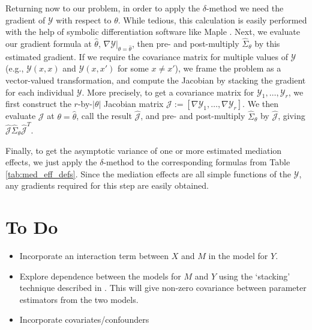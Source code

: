 \documentclass{article}
\newcommand{\sY}{\mathcal{Y}}
\begin{document}
Returning now to our problem, in order to apply the $\delta$-method we need the gradient of $\sY$ with respect to $\theta$. While tedious, this calculation is easily performed with the help of symbolic differentiation software like Maple \citep{Map20}. Next, we evaluate our gradient formula at $\hat{\theta}$, $\left. \nabla \sY \right|_{\theta = \hat{\theta}}$, then pre- and post-multiply $\hat{\Sigma}_\theta$ by this estimated gradient. If we require the covariance matrix for multiple values of $\sY$ (e.g., $\sY(x,x)$ and $\sY(x,x')$ for some $x \neq x'$), we frame the problem as a vector-valued transformation, and compute the Jacobian by stacking the gradient for each individual $\sY$. More precisely, to get a covariance matrix for $\sY_1, \ldots, \sY_r$, we first construct the $r$-by-$|\theta|$ Jacobian matrix $\mathcal{J} := [\nabla \sY_1, \ldots, \nabla \sY_r]$. We then evaluate $\mathcal{J}$ at $\theta = \hat{\theta}$, call the result $\hat{\mathcal{J}}$, and pre- and post-multiply $\hat{\Sigma}_\theta$ by $\hat{\mathcal{J}}$, giving $\hat{\mathcal{J}} \hat{\Sigma}_\theta \hat{\mathcal{J}}^T$.

Finally, to get the asymptotic variance of one or more estimated mediation effects, we just apply the $\delta$-method to the corresponding formulas from Table \ref{tab:med_eff_defs}. Since the mediation effects are all simple functions of the $\sY$, any gradients required for this step are easily obtained.


\section{To Do}
\begin{itemize}
    \item Incorporate an interaction term between $X$ and $M$ in the model for $Y$.
    \item Explore dependence between the models for $M$ and $Y$ using the `stacking' technique described in \citet{Bau06}. This will give non-zero covariance between parameter estimators from the two models.
    \item Incorporate covariates/confounders
\end{itemize}


% 
% 
\end{document}
